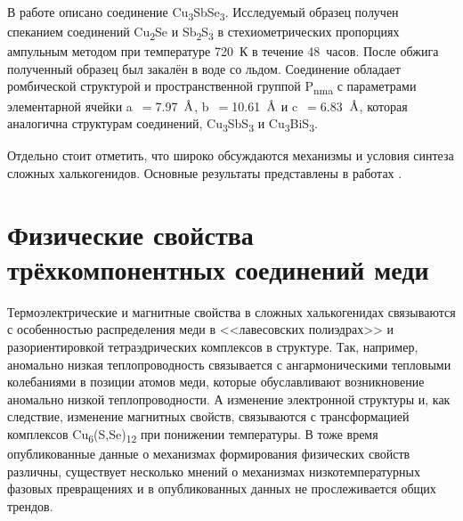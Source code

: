 В работе \cite{31_Whitfield_1980} описано соединение Cu\textsubscript{3}SbSe\textsubscript{3}. Исследуемый образец получен спеканием соединений Cu\textsubscript{2}Se и Sb\textsubscript{2}S\textsubscript{3} в стехиометрических пропорциях ампульным методом при температуре 720~К в течение 48~часов. После обжига полученный образец был закалён в воде со льдом. Соединение обладает ромбической структурой и пространственной группой P\textsubscript{nma} с параметрами элементарной ячейки a~$=$7.97~$\mbox{\normalfont\AA}$, b~$=$10.61~$\mbox{\normalfont\AA}$ и c~$=$6.83~$\mbox{\normalfont\AA}$, которая аналогична структурам соединений,  Cu\textsubscript{3}SbS\textsubscript{3} и  Cu\textsubscript{3}BiS\textsubscript{3}.


Отдельно стоит отметить, что широко обсуждаются механизмы и условия синтеза сложных халькогенидов. Основные результаты представлены в работах \cite{Sis_Frost2002,sis_karup59new,sis_Mueller2002,sis_Mueller2003,sis_Raghavan2004,sis_seal1990tetrahedrite,sis_Skinner1972,sis_Taras_Bryndzia_1988,sis_Tomkins2006,sis1_1347-4065-8-4-443,sis1_BALAZ1995375,sis1_Braga2008,sis1_Pfitzner:se0205,sis1_WELLER2017794}.
\newpage


\section{Физические свойства трёхкомпонентных соединений меди} \label{sect1_3}

Термоэлектрические и магнитные свойства в сложных халькогенидах связываются с особенностью распределения меди в <<лавесовских полиэдрах>>  и разориентировкой тетраэдрических комплексов в структуре. Так, например, аномально низкая теплопроводность связывается с ангармоническими тепловыми колебаниями в позиции атомов меди\cite{Mishra2017}, которые обуславливают возникновение аномально низкой теплопроводности. А изменение электронной структуры и, как следствие, изменение магнитных свойств, связываются с трансформацией комплексов  Cu\textsubscript{6}(S,Se)\textsubscript{12} при понижении температуры\cite{Gainov2008}. В тоже время опубликованные данные о механизмах формирования физических свойств различны, существует несколько мнений о механизмах низкотемпературных фазовых превращениях и в опубликованных данных не прослеживается общих трендов.


